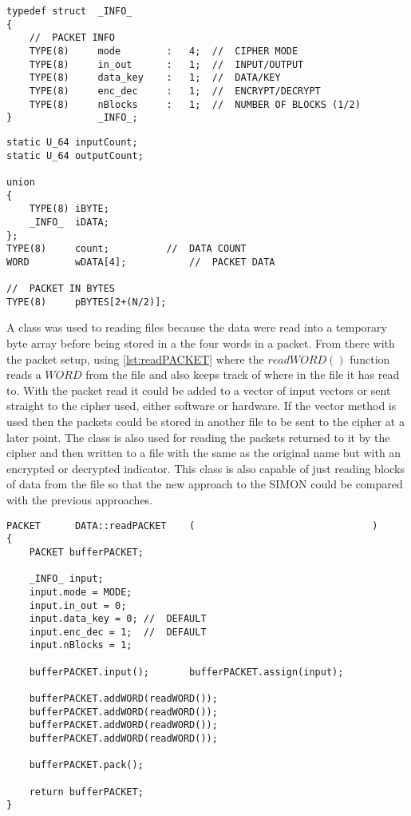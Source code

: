 \documentclass[12pt,twoside,a4paper]{report}
\begin{document}
	\begin{minipage}{\linewidth}
	\begin{lstlisting}[label={lst:_INFO_},caption={Declaration of Packet information},style=CStyle]
typedef struct	_INFO_
{
	//	PACKET INFO
	TYPE(8)		mode		:	4;	//	CIPHER MODE
	TYPE(8)		in_out		:	1;	//	INPUT/OUTPUT
	TYPE(8)		data_key	:	1;	//	DATA/KEY
	TYPE(8)		enc_dec		:	1;	//	ENCRYPT/DECRYPT
	TYPE(8)		nBlocks		:	1;	//	NUMBER OF BLOCKS (1/2)
}				_INFO_;
	\end{lstlisting}
	\end{minipage}

	\begin{minipage}{\linewidth}
	\begin{lstlisting}[label={lst:PACKET},caption={Data stored in Packet class},style=CStyle]	
static U_64	inputCount;
static U_64	outputCount;

union
{
	TYPE(8)	iBYTE;
	_INFO_	iDATA;
};
TYPE(8)		count;			//	DATA COUNT
WORD		wDATA[4];			//	PACKET DATA

//	PACKET IN BYTES	
TYPE(8)		pBYTES[2+(N/2)];
	\end{lstlisting}
	\end{minipage}
   	
   	A class was used to reading files because the data were read into a temporary byte array before being stored in a the four words in a packet. From there with the packet setup, using \autoref{lst:readPACKET} where the $readWORD()$ function reads a $WORD$ from the file and also keeps track of where in the file it has read to. With the packet read it could be added to a vector of input vectors or sent straight to the cipher used, either software or hardware. If the vector method is used then the packets could be stored in another file to be sent to the cipher at a later point. The class is also used for reading the packets returned to it by the cipher and then written to a file with the same as the original name but with an encrypted or decrypted indicator. This class is also capable of just reading blocks of data from the file so that the new approach to the SIMON could be compared with the previous approaches.

 	\begin{minipage}{\linewidth}
	\begin{lstlisting}[label={lst:readPACKET},caption={Function used for reading a packet},style=CStyle]	
PACKET		DATA::readPACKET	(								)
{
	PACKET bufferPACKET;
	
	_INFO_ input;
	input.mode = MODE;
	input.in_out = 0;
	input.data_key = 0;	//	DEFAULT
	input.enc_dec = 1;	//	DEFAULT
	input.nBlocks = 1;
	
	bufferPACKET.input();		bufferPACKET.assign(input);
	
	bufferPACKET.addWORD(readWORD());
	bufferPACKET.addWORD(readWORD());
	bufferPACKET.addWORD(readWORD());
	bufferPACKET.addWORD(readWORD());
	
	bufferPACKET.pack();
	
	return bufferPACKET;
}
	\end{lstlisting}
	\end{minipage}
	
\end{document}
